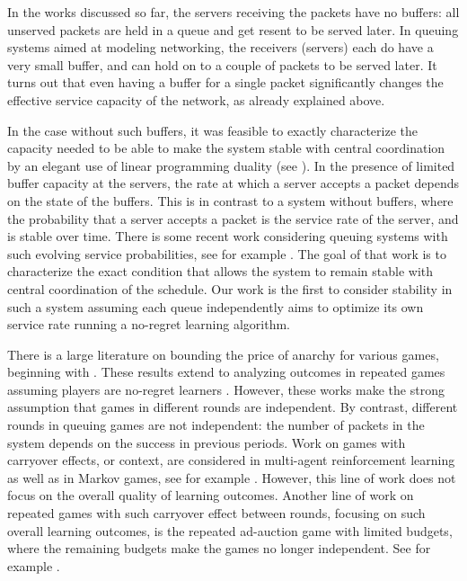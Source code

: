 In the works discussed so far, the servers receiving the packets have no buffers: all unserved packets are held in a queue and get resent to be served later. 
In queuing systems aimed at modeling networking, the receivers (servers) each do have a very small buffer, and can hold on to a couple of packets to be served later. It turns out that even having a buffer for a single packet significantly changes the effective service capacity of the network, as already explained above. 

In the case without such buffers, it was feasible to exactly characterize the capacity needed to be able to make the system stable with central coordination by an elegant use of linear programming duality (see \cite{DBLP:conf/wine/FuHL22}). 
In the presence of limited buffer capacity at the servers, the rate at which a server accepts a packet depends on the state of the buffers. This is in contrast to a system without buffers, where the probability that a server accepts a packet is the service rate of the server, and is stable over time. There is some recent work considering queuing systems with such evolving service probabilities, see for example \cite{DBLP:journals/sigmetrics/GrosofHHS24,DBLP:journals/corr/abs-2405-04102}. The goal of that work is to characterize the exact condition that allows the system to remain stable with central coordination of the schedule. Our work is the first to consider stability in such a system assuming each queue independently aims to optimize its own service rate running a no-regret learning algorithm. 

There is a large literature on bounding the price of anarchy for various games, beginning with \cite{DBLP:conf/stacs/KoutsoupiasP99}. These results extend to analyzing outcomes in repeated games assuming players are no-regret learners \cite{DBLP:journals/siamcomp/BalcanBM13,DBLP:journals/jacm/Roughgarden15,DBLP:conf/stoc/SyrgkanisT13}. However, these works make the strong assumption that games in different rounds are independent. By contrast, different rounds in queuing games are not independent: the number of packets in the system depends on the success in previous periods. Work on games with carryover effects, or context, are considered in multi-agent reinforcement learning as well as in Markov games, see for example \cite{littman1994markov,busoniu2008comprehensive,zhang2021multi}. However, this line of work does not focus on the overall quality of learning outcomes. Another line of work on repeated games with such carryover effect between rounds, focusing on such overall learning outcomes, is the repeated ad-auction game with limited budgets, where the remaining budgets make the games no longer independent. See  
for example \cite{DBLP:journals/mansci/BalseiroG19,DBLP:conf/innovations/GaitondeLLLS23,fikioris2023liquid,fikioris2024learning}. 
